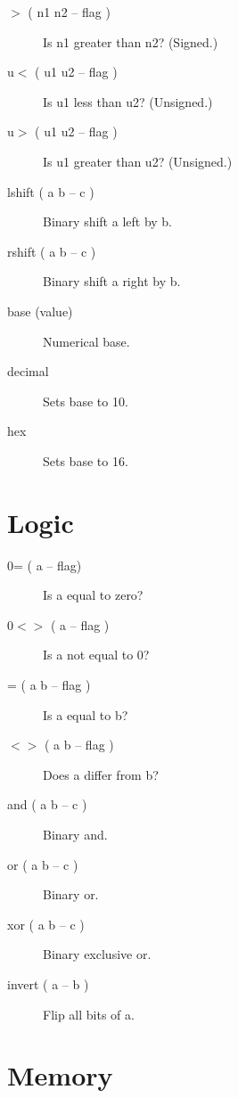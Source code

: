\begin{description}
\item[$>$ ( n1 n2 -- flag )] Is n1 greater than n2? (Signed.)
\item[u$<$ ( u1 u2 -- flag )] Is u1 less than u2? (Unsigned.)
\item[u$>$ ( u1 u2 -- flag )] Is u1 greater than u2? (Unsigned.)
\item[lshift ( a b -- c )] Binary shift a left by b.
\item[rshift ( a b -- c )] Binary shift a right by b.
\item[base (value)] Numerical base.
\item[decimal] Sets base to 10.
\item[hex] Sets base to 16.

\end{description}

\section{Logic}

\begin{description}
\item[0= ( a -- flag)] Is a equal to zero?
\item[0$<>$ ( a -- flag )] Is a not equal to 0?
\item[= ( a b -- flag )] Is a equal to b?
\item[$<>$ ( a b -- flag )] Does a differ from b?
\item[and ( a b -- c )] Binary and.  
\item[or ( a b -- c )] Binary or.  
\item[xor ( a b -- c )] Binary exclusive or.  
\item[invert ( a -- b )] Flip all bits of a.  
\end{description}

\section{Memory}

